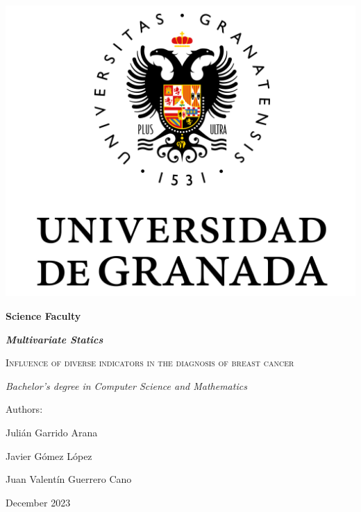 \documentclass[10pt,a4paper]{article}
\theoremstyle{definition}
\theoremstyle{definition}
\begin{document}
	
\begin{titlepage}
	\centering
	{\includegraphics[scale=0.5]{Logo_UGR.png}\par}
	\vspace{1cm}
	{\bfseries\Large Science Faculty \par}
	\vspace{0.5cm}
	{\bfseries\itshape\large Multivariate Statics \par}
	\vspace{2.5cm}
	{\scshape\Huge Influence of diverse indicators in the diagnosis of breast cancer\par}
	\vspace{3cm}
	{\itshape\Large Bachelor's degree in Computer Science and Mathematics}
	\vfill
	{\Large Authors: \par}
	{\Large Julián Garrido Arana \par}
	{\Large Javier Gómez López \par}
	{\Large Juan Valentín Guerrero Cano \par}
	
	\vfill
	{\Large December 2023 \par}
\end{titlepage}

\thispagestyle{empty}
\null
\vfill
\end{document}
